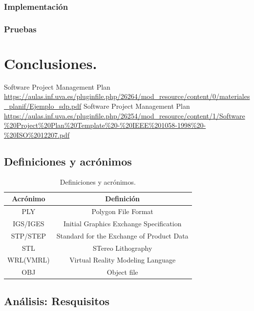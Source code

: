 \documentclass[a4paper,11pt, twoside]{article}
\begin{document}
\subsubsection{Implementación}
\subsubsection{Pruebas}
\section{Conclusiones.}
\newpage
\renewcommand\refname{Bibliografía}
\begin{thebibliography}{99}
    Software Project Management Plan \url{https://aulas.inf.uva.es/pluginfile.php/26264/mod_resource/content/0/materiales_planif/Ejemplo_sdp.pdf}
    Software Project  
Management Plan \url{https://aulas.inf.uva.es/pluginfile.php/26254/mod_resource/content/1/Software\%20Project\%20Plan\%20Template\%20-\%20IEEE\%201058-1998\%20-\%20ISO\%2012207.pdf}
\end{thebibliography}

\newpage

\begin{appendices}
\addappheadtotoc
{}
\appendixpage

\renewcommand\thesubsection{Anexo \Roman{subsection}}

\subsection{Definiciones y acrónimos}\label{ANEXOI}
\begin{table}[!h]
        \centering
        \begin{tabular}{|c|c|}
        \hline
        \textbf{\large Acrónimo} & \textbf{\large Definición}\\
        \hline
        PLY & Polygon File Format\\
        \hline
        IGS/IGES & Initial Graphics Exchange Specification\\
        \hline
        STP/STEP & Standard for the Exchange of Product Data\\
        \hline
        STL & STereo Lithography\\
        \hline
        WRL(VMRL) & Virtual Reality Modeling Language\\
        \hline
        OBJ & Object file\\
        \hline
        \end{tabular}
        \caption{Definiciones y acrónimos.}
        \label{ta:defyacr}
    \end{table}
    
    \subsection{Análisis: Resquisitos}\label{ANEXOII}
    
\end{appendices}
\end{document}
